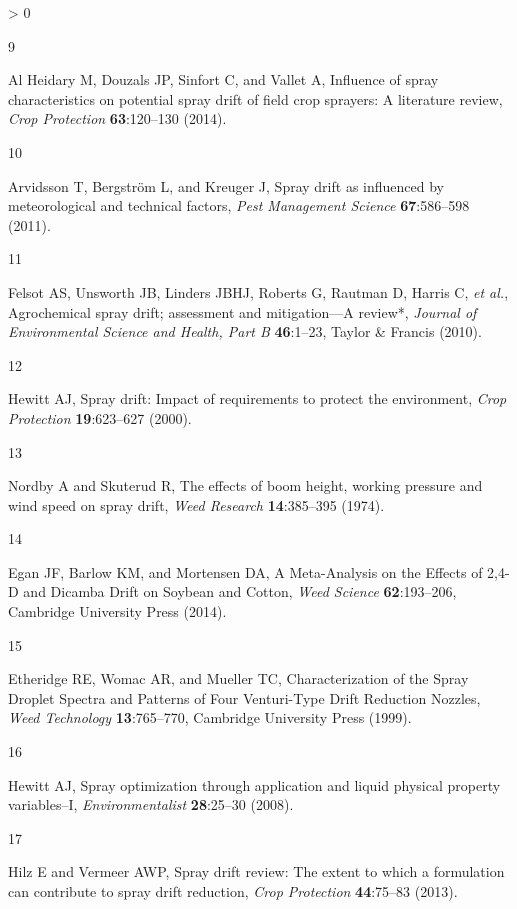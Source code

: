 \documentclass[
  12pt,
  a4paper,
]{article}
\newlength{\cslhangindent}
\newlength{\csllabelwidth}
\newenvironment{CSLReferences}[2] %
 {%
  \setlength{\parindent}{0pt}
  \ifodd #1 \everypar{\setlength{\hangindent}{\cslhangindent}}\ignorespaces\fi
  \ifnum #2 > 0
  \setlength{\parskip}{#2\baselineskip}
  \fi
 }%
 {}
\newcommand{\CSLLeftMargin}[1]{\parbox[t]{\csllabelwidth}{#1}}
\newcommand{\CSLRightInline}[1]{\parbox[t]{\linewidth - \csllabelwidth}{#1}\break}
\begin{document}
\begin{CSLReferences}{1}{0}
\leavevmode\hypertarget{ref-alheidary2014}{}%
\CSLLeftMargin{9 }
\CSLRightInline{Al Heidary M, Douzals JP, Sinfort C, and Vallet A,
Influence of spray characteristics on potential spray drift of field
crop sprayers: {A} literature review, \emph{Crop Protection}
\textbf{63}:120--130 (2014).}

\leavevmode\hypertarget{ref-arvidsson2011}{}%
\CSLLeftMargin{10 }
\CSLRightInline{Arvidsson T, Bergström L, and Kreuger J, Spray drift as
influenced by meteorological and technical factors, \emph{Pest
Management Science} \textbf{67}:586--598 (2011).}

\leavevmode\hypertarget{ref-felsot2010}{}%
\CSLLeftMargin{11 }
\CSLRightInline{Felsot AS, Unsworth JB, Linders JBHJ, Roberts G, Rautman
D, Harris C, \emph{et al.}, Agrochemical spray drift; assessment and
mitigation---{A} review*, \emph{Journal of Environmental Science and
Health, Part B} \textbf{46}:1--23, {Taylor \& Francis} (2010).}

\leavevmode\hypertarget{ref-hewitt2000}{}%
\CSLLeftMargin{12 }
\CSLRightInline{Hewitt AJ, Spray drift: Impact of requirements to
protect the environment, \emph{Crop Protection} \textbf{19}:623--627
(2000).}

\leavevmode\hypertarget{ref-nordby1974}{}%
\CSLLeftMargin{13 }
\CSLRightInline{Nordby A and Skuterud R, The effects of boom height,
working pressure and wind speed on spray drift, \emph{Weed Research}
\textbf{14}:385--395 (1974).}

\leavevmode\hypertarget{ref-egan2014}{}%
\CSLLeftMargin{14 }
\CSLRightInline{Egan JF, Barlow KM, and Mortensen DA, A
{Meta}-{Analysis} on the {Effects} of 2,4-{D} and {Dicamba Drift} on
{Soybean} and {Cotton}, \emph{Weed Science} \textbf{62}:193--206,
{Cambridge University Press} (2014).}

\leavevmode\hypertarget{ref-etheridge1999}{}%
\CSLLeftMargin{15 }
\CSLRightInline{Etheridge RE, Womac AR, and Mueller TC, Characterization
of the {Spray Droplet Spectra} and {Patterns} of {Four Venturi}-{Type
Drift Reduction Nozzles}, \emph{Weed Technology} \textbf{13}:765--770,
{Cambridge University Press} (1999).}

\leavevmode\hypertarget{ref-hewitt2008}{}%
\CSLLeftMargin{16 }
\CSLRightInline{Hewitt AJ, Spray optimization through application and
liquid physical property variables--{I}, \emph{Environmentalist}
\textbf{28}:25--30 (2008).}

\leavevmode\hypertarget{ref-hilz2013}{}%
\CSLLeftMargin{17 }
\CSLRightInline{Hilz E and Vermeer AWP, Spray drift review: {The} extent
to which a formulation can contribute to spray drift reduction,
\emph{Crop Protection} \textbf{44}:75--83 (2013).}


\end{CSLReferences}
\end{document}
